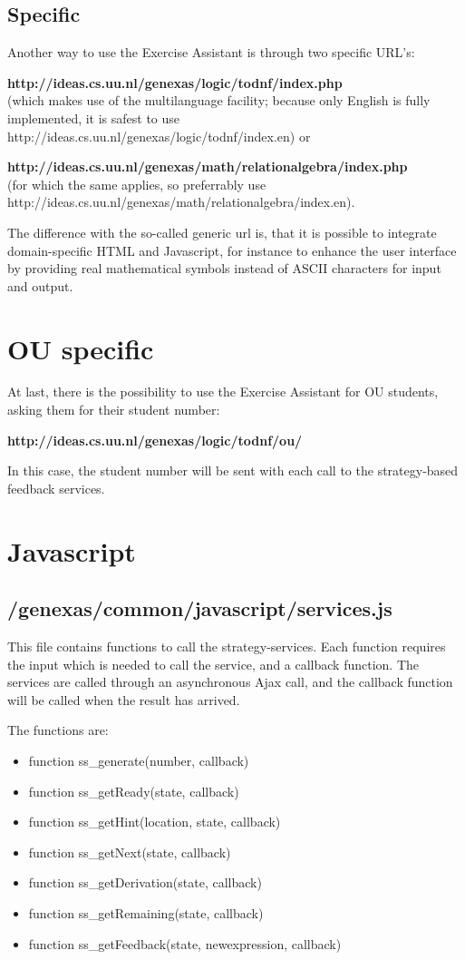 \documentclass{article}
\begin{document}
\subsection{Specific}
Another way to use the Exercise Assistant is through two specific URL's: 

\textbf{http://ideas.cs.uu.nl/genexas/logic/todnf/index.php} \\ (which makes use of the multilanguage facility; because only English is fully implemented, it is safest to use http://ideas.cs.uu.nl/genexas/logic/todnf/index.en) or 

\textbf{http://ideas.cs.uu.nl/genexas/math/relationalgebra/index.php} \\ (for which the same applies, so preferrably use http://ideas.cs.uu.nl/genexas/math/relationalgebra/index.en).

The difference with the so-called generic url is, that it is possible to integrate domain-specific HTML and Javascript, for instance to enhance the user interface by providing real mathematical symbols instead of ASCII characters for input and output.

\section{OU specific}
At last, there is the possibility to use the Exercise Assistant for OU students, asking them for their student number:

\textbf{http://ideas.cs.uu.nl/genexas/logic/todnf/ou/}

In this case, the student number will be sent with each call to the strategy-based feedback services.

\section{Javascript}
\subsection{/genexas/common/javascript/services.js}
This file contains functions to call the strategy-services. Each function requires the input which is needed to call the service, and a callback function. The services are called through an asynchronous Ajax call, and the callback function will be called when the result has arrived.

The functions are:
\begin{itemize}
\item function ss\_generate(number, callback) 
\item function ss\_getReady(state, callback) 
\item function ss\_getHint(location, state, callback) 
\item function ss\_getNext(state, callback)
\item function ss\_getDerivation(state, callback)
\item function ss\_getRemaining(state, callback) 
\item function ss\_getFeedback(state, newexpression, callback)
\end{itemize}
\end{document}
